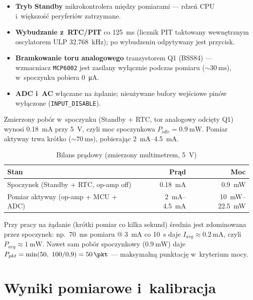 \documentclass[a4paper,11pt]{article}
\begin{document}
\begin{itemize}[nosep]
	\item \textbf{Tryb Standby} mikrokontrolera między pomiarami --- rdzeń CPU
	i~większość peryferiów zatrzymane.
	\item \textbf{Wybudzanie z~RTC/PIT} co \SI{125}{\milli\second} (licznik PIT
	taktowany wewnętrznym oscylatorem ULP \SI{32,768}{\kilo\hertz}); po wybudzeniu
	odpytywany jest przycisk.
	\item \textbf{Bramkowanie toru analogowego} tranzystorem Q1 (BSS84) ---
	wzmacniacz \texttt{MCP6002} jest zasilany wyłącznie podczas pomiaru
	($\sim\SI{30}{\milli\second}$), w~spoczynku pobiera \SI{0}{\micro\ampere}.
	\item \textbf{ADC i~AC} włączane na żądanie; nieużywane bufory wejściowe pinów
	wyłączone (\texttt{INPUT\_DISABLE}).
\end{itemize}

Zmierzony pobór w~spoczynku (Standby + RTC, tor analogowy odcięty Q1) wynosi
\SI{0,18}{\milli\ampere} przy \SI{5}{\volt}, czyli moc spoczynkowa
$P_{idle}=\SI{0,9}{\milli\watt}$. Pomiar aktywny trwa krótko
(${\sim}\SI{70}{\milli\second}$), pobierając \SIrange{2}{4,5}{\milli\ampere}.

\begin{table}[H]
	\centering
	\caption{Bilans prądowy (zmierzony multimetrem, \SI{5}{\volt})}
	\label{tab:prad}
	\begin{tabularx}{\textwidth}{Xrr}
		\toprule
		\textbf{Stan} & \textbf{Prąd} & \textbf{Moc} \\
		\midrule
		Spoczynek (Standby + RTC, op-amp off) & \SI{0,18}{\milli\ampere} & \SI{0,9}{\milli\watt} \\
		Pomiar aktywny (op-amp + MCU + ADC) & \SIrange{2}{4,5}{\milli\ampere} & \SIrange{10}{22,5}{\milli\watt} \\
		\bottomrule
	\end{tabularx}
\end{table}

Przy pracy na żądanie (krótki pomiar co kilka sekund) średnia jest zdominowana
przez spoczynek: np.\ \SI{70}{\milli\second} pomiaru @ \SI{3}{\milli\ampere} co
\SI{10}{\second} daje $I_{avg}\approx\SI{0,2}{\milli\ampere}$, czyli
$P_{avg}\approx\SI{1}{\milli\watt}$. Nawet sam pobór spoczynkowy
($\SI{0,9}{\milli\watt}$) daje
$P_{pkt}=\min(50,\ 100/0{,}9)=\SI{50}{\pkt}$ --- maksymalną punktację
w~kryterium mocy.

\section{Wyniki pomiarowe i~kalibracja}
\label{sec:wyniki}
\end{document}

